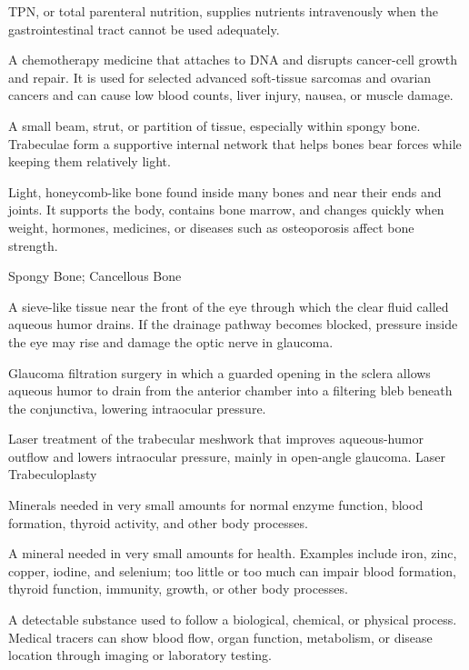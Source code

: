  TPN, or total parenteral nutrition, supplies nutrients intravenously when the gastrointestinal tract cannot be used adequately.

 A chemotherapy medicine that attaches to DNA and disrupts cancer-cell growth and repair. It is used for selected advanced soft-tissue sarcomas and ovarian cancers and can cause low blood counts, liver injury, nausea, or muscle damage.

 A small beam, strut, or partition of tissue, especially within spongy bone. Trabeculae form a supportive internal network that helps bones bear forces while keeping them relatively light.

 Light, honeycomb-like bone found inside many bones and near their ends and joints. It supports the body, contains bone marrow, and changes quickly when weight, hormones, medicines, or diseases such as osteoporosis affect bone strength.

\synonyms
Spongy Bone; Cancellous Bone

 A sieve-like tissue near the front of the eye through which the clear fluid called aqueous humor drains. If the drainage pathway becomes blocked, pressure inside the eye may rise and damage the optic nerve in glaucoma.

 Glaucoma filtration surgery in which a guarded opening in the sclera allows aqueous humor to drain from the anterior chamber into a filtering bleb beneath the conjunctiva, lowering intraocular pressure.

 Laser treatment of the trabecular meshwork that improves aqueous-humor outflow and lowers intraocular pressure, mainly in open-angle glaucoma.
\synonyms
Laser Trabeculoplasty

 Minerals needed in very small amounts for normal enzyme function, blood formation, thyroid activity, and other body processes.

 A mineral needed in very small amounts for health. Examples include iron, zinc, copper, iodine, and selenium; too little or too much can impair blood formation, thyroid function, immunity, growth, or other body processes.

 A detectable substance used to follow a biological, chemical, or physical process. Medical tracers can show blood flow, organ function, metabolism, or disease location through imaging or laboratory testing.

